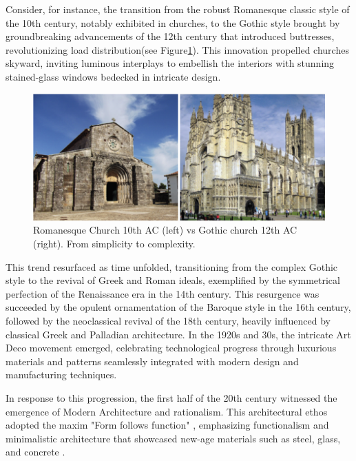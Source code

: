 Consider, for instance, the transition from the robust Romanesque classic style of the 10th century, notably exhibited in churches, to the Gothic style brought by groundbreaking advancements of the 12th century that introduced buttresses, revolutionizing load distribution\cite{Arora2023}(see Figure\ref{fig:RomanesquevsGothic}).
This innovation propelled churches skyward, inviting luminous interplays to embellish the interiors with stunning stained-glass windows bedecked in intricate design\cite{Stacbond2020}.

     \begin{figure}[htb]
          \centering
          \includegraphics[width= \linewidth]{Images/RomanesqueVsGothic}
          \caption{Romanesque Church 10th AC (left) vs Gothic church 12th AC (right). From simplicity to complexity.}
          \label{fig:RomanesquevsGothic}
        \end{figure}

This trend resurfaced as time unfolded, transitioning from the complex Gothic style to the revival of Greek and Roman ideals, exemplified by the symmetrical perfection of the Renaissance era in the 14th century. This resurgence was succeeded by the opulent ornamentation of the Baroque style in the 16th century, followed by the neoclassical revival of the 18th century, heavily influenced by classical Greek and Palladian architecture. In the 1920s and 30s, the intricate Art Deco movement emerged, celebrating technological progress through luxurious materials and patterns seamlessly integrated with modern design and manufacturing techniques.

In response to this progression, the first half of the 20th century witnessed the emergence of Modern Architecture and rationalism. This architectural ethos adopted the maxim "Form follows function" \cite{Gage2015}, emphasizing functionalism and minimalistic architecture that showcased new-age materials such as steel, glass, and concrete \cite{Arora2023}.

